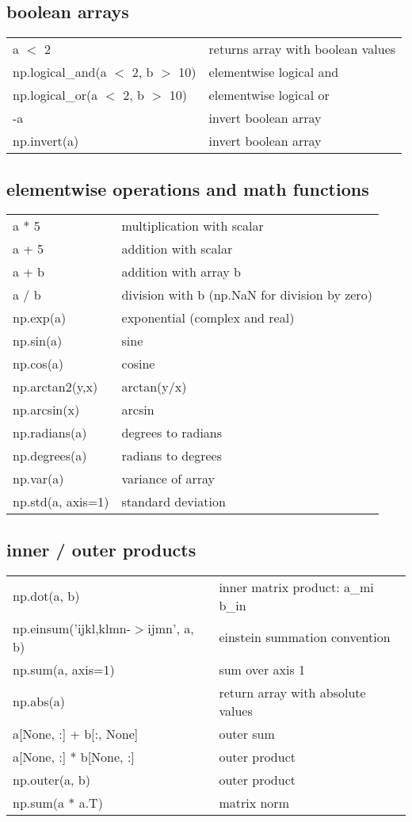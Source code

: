 \documentclass[10pt, a4paper, twocolumn]{article}
\begin{document}
\subsection*{boolean arrays}
\begin{tabular}{ p{} p{} }
    a $<$ 2 & returns array with boolean values\\
np.logical\_and(a $<$ 2, b $>$ 10) & elementwise logical and\\
np.logical\_or(a $<$ 2, b $>$ 10) & elementwise logical or\\
                           -a & invert boolean array\\
                 np.invert(a) & invert boolean array\\
\end{tabular}

\subsection*{elementwise operations and math functions}
\begin{tabular}{ p{} p{} }
 a * 5 & multiplication with scalar\\
 a + 5 & addition with scalar\\
 a + b & addition with array b\\
 a / b & division with b (np.NaN for division by zero)\\
 np.exp(a) & exponential (complex and real)\\
 np.sin(a) & sine\\
 np.cos(a) & cosine\\
 np.arctan2(y,x) & arctan(y/x)\\
 np.arcsin(x) & arcsin\\
 np.radians(a) & degrees to radians\\
 np.degrees(a) & radians to degrees\\
 np.var(a) & variance of array\\
 np.std(a, axis=1) & standard deviation\\
\end{tabular}

\subsection*{inner / outer products}
\begin{tabular}{ p{} p{} }
 np.dot(a, b) & inner matrix product: a\_mi b\_in \\
 np.einsum('ijkl,klmn-$>$ijmn', a, b) & einstein summation convention\\
 np.sum(a, axis=1) & sum over axis 1\\
 np.abs(a) & return array with absolute values\\
 a[None, :] + b[:, None] & outer sum\\
 a[None, :] * b[None, :] & outer product\\
 np.outer(a, b) & outer product\\
 np.sum(a * a.T) & matrix norm\\
\end{tabular}
\end{document}
